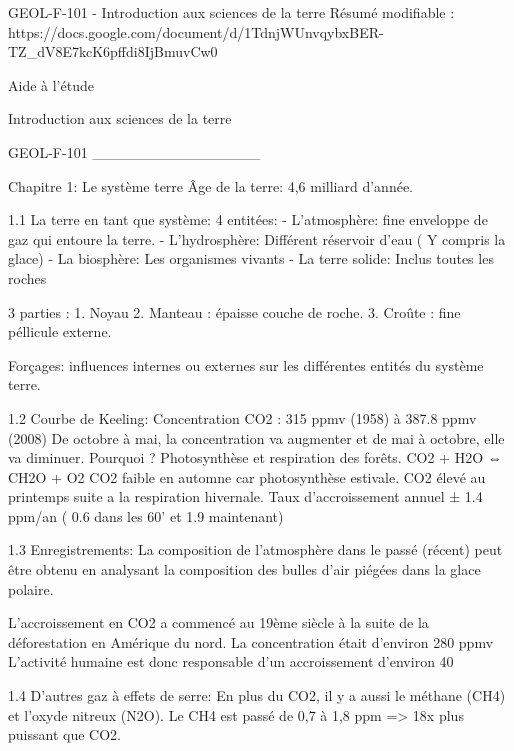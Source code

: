 ﻿GEOL-F-101 - Introduction aux sciences de la terre
Résumé modifiable :
https://docs.google.com/document/d/1TdnjWUnvqybxBER-TZ_dV8E7kcK6pffdi8IjBmuvCw0









Aide à l’étude

Introduction aux sciences de la terre

GEOL-F-101
________________


Chapitre 1: Le système terre
Âge de la terre: 4,6 milliard d’année.


1.1 La terre en tant que système:
4 entitées:
- L’atmosphère: fine enveloppe de gaz qui entoure la terre.
- L’hydrosphère: Différent réservoir d’eau ( Y compris la glace)
- La biosphère: Les organismes vivants
- La terre solide: Inclus toutes les roches


  

	



3 parties :
1. Noyau
2. Manteau : épaisse couche de roche.
3. Croûte : fine péllicule externe.
	

Forçages: influences internes ou externes sur les différentes entités du système terre.


1.2 Courbe de Keeling:
Concentration CO2 : 315 ppmv (1958) à 387.8 ppmv (2008)
De octobre à mai, la concentration va augmenter et de mai à octobre, elle va diminuer.
Pourquoi ? Photosynthèse et respiration des forêts.
        CO2 + H2O ⇔  CH2O + O2
        CO2 faible en automne car photosynthèse estivale.
        CO2 élevé au printemps suite a la respiration hivernale.
Taux d’accroissement annuel ± 1.4 ppm/an ( 0.6 dans les 60’ et 1.9 maintenant)


1.3 Enregistrements:
La composition de l’atmosphère dans le passé (récent) peut être obtenu en analysant la composition des bulles d’air piégées dans la glace polaire.


L’accroissement en CO2 a commencé au 19ème siècle à la suite de la déforestation en Amérique du nord. La concentration était d’environ 280 ppmv
L’activité humaine est donc responsable d’un accroissement d’environ 40 %




1.4 D’autres gaz à effets de serre:
En plus du CO2, il y a aussi le méthane (CH4) et l’oxyde nitreux (N2O).
Le CH4 est passé de 0,7 à 1,8 ppm => 18x plus puissant que CO2.


